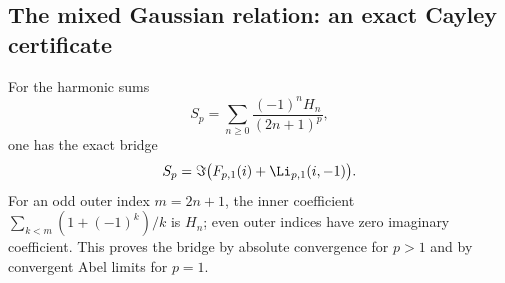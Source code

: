 \subsection{The mixed Gaussian relation: an exact Cayley certificate}

For the harmonic sums
\[
 S_p=\sum_{n\ge0}\frac{(-1)^nH_n}{(2n+1)^p},
\]
one has the exact bridge
\begin{equation}
 S_p=\Im\bigl(F_{p,1}(i)+\Li_{p,1}(i,-1)\bigr).
 \label{gaussian:eq:S-mixed}
\end{equation}
For an odd outer index $m=2n+1$, the inner coefficient
$\sum_{k<m}(1+(-1)^k)/k$ is $H_n$; even outer indices have zero
imaginary coefficient. This proves the bridge by absolute convergence
for $p>1$ and by convergent Abel limits for $p=1$.

